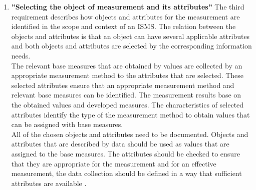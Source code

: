 \begin{enumerate}[label=(\alph*)]
  \item \label{itm:c} \textbf{''Selecting the object of measurement and its attributes''}
  The third requirement describes how objects and attributes for the measurement are identified in the scope and context of an ISMS. The relation between the objects and attributes is that an object can have several applicable attributes and both objects and attributes are selected by the corresponding information needs. \\
  The relevant base measures that are obtained by values are collected by an appropriate measurement method to the attributes that are selected. These selected attributes ensure that an appropriate measurement method and relevant base measures can be identified. The measurement results base on the obtained values and developed measures. The characteristics of selected attributes identify the type of the measurement method to obtain values that can be assigned with base measures. \\
  All of the chosen objects and attributes need to be documented. Objects and attributes that are described by data should be used as values that are assigned to the base measures. The attributes should be checked to ensure that they are appropriate for the measurement and for an effective measurement, the data collection should be defined in a way that sufficient attributes are available \cite{ISO_27004_2009}. \\


\end{enumerate}
